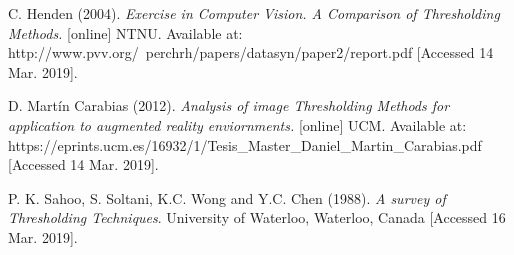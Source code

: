 \documentclass[12]{article}
\begin{document}
\begin{thebibliography}{100}

C. Henden (2004). \textit{ Exercise in Computer Vision. A Comparison of Thresholding Methods.} [online] NTNU. Available at: http://www.pvv.org/~perchrh/papers/datasyn/paper2/report.pdf [Accessed 14 Mar. 2019].


D. Martín Carabias (2012). \textit{Analysis of image Thresholding Methods for application to augmented reality enviornments.} [online] UCM. Available at: https://eprints.ucm.es/16932/1/Tesis\_Master\_Daniel\_Martin\_Carabias.pdf [Accessed 14 Mar. 2019].


P. K. Sahoo, S. Soltani, K.C. Wong and Y.C. Chen (1988). \textit{A survey of Thresholding Techniques}. University of Waterloo, Waterloo, Canada  [Accessed 16 Mar. 2019].

\end{thebibliography}
\end{document}
